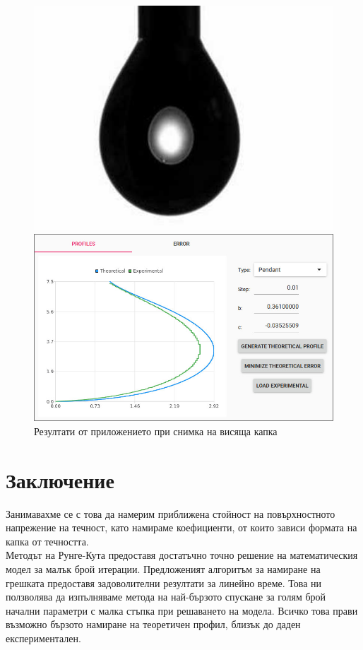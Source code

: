 \documentclass{article}
\begin{document}
\begin{figure}[H]
\centering
\begin{minipage}{0.5\textwidth}
  \centering
  \includegraphics[width=0.7\linewidth]{new_pendant_1.jpg}
\end{minipage}%
\begin{minipage}{0.5\textwidth}
  \centering
  \includegraphics[width=0.9\linewidth]{app_new_pendant_1.jpg}
\end{minipage}
\caption{Резултати от приложението при снимка на висяща капка}
\end{figure}
\section{Заключение}
Занимавахме се с това да намерим приближена стойност на повърхностното напрежение на течност, като намираме коефициенти, от които зависи формата на капка от течността.\\
Методът на Рунге-Кута предоставя достатъчно точно решение на математическия модел за малък брой итерации. Предложеният алгоритъм за намиране на грешката предоставя задоволителни резултати за линейно време. Това ни ползволява да изпълняваме метода на най-бързото спускане за голям брой начални параметри с малка стъпка при решаването на модела. Всичко това прави възможно бързото намиране на теоретичен профил, близък до даден експериментален.
\newpage
\end{document}
